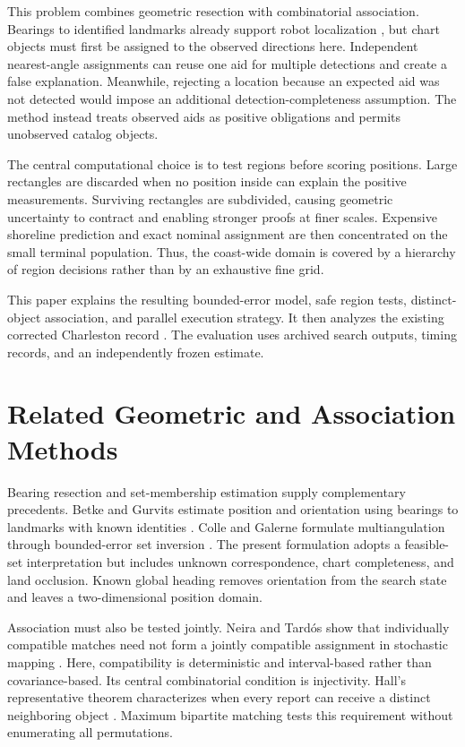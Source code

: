 \documentclass[conference]{IEEEtran}
\begin{document}
This problem combines geometric resection with combinatorial association. Bearings to identified landmarks already support robot localization \cite{Betke1997LandmarkLocalization}, but chart objects must first be assigned to the observed directions here. Independent nearest-angle assignments can reuse one aid for multiple detections and create a false explanation. Meanwhile, rejecting a location because an expected aid was not detected would impose an additional detection-completeness assumption. The method instead treats observed aids as positive obligations and permits unobserved catalog objects.

The central computational choice is to test regions before scoring positions. Large rectangles are discarded when no position inside can explain the positive measurements. Surviving rectangles are subdivided, causing geometric uncertainty to contract and enabling stronger proofs at finer scales. Expensive shoreline prediction and exact nominal assignment are then concentrated on the small terminal population. Thus, the coast-wide domain is covered by a hierarchy of region decisions rather than by an exhaustive fine grid.

This paper explains the resulting bounded-error model, safe region tests, distinct-object association, and parallel execution strategy. It then analyzes the existing corrected Charleston record \cite{Vaught2026CharlestonRecord}. The evaluation uses archived search outputs, timing records, and an independently frozen estimate.

\section{Related Geometric and Association Methods}
Bearing resection and set-membership estimation supply complementary precedents. Betke and Gurvits estimate position and orientation using bearings to landmarks with known identities \cite{Betke1997LandmarkLocalization}. Colle and Galerne formulate multiangulation through bounded-error set inversion \cite{Colle2013SetInversion}. The present formulation adopts a feasible-set interpretation but includes unknown correspondence, chart completeness, and land occlusion. Known global heading removes orientation from the search state and leaves a two-dimensional position domain.

Association must also be tested jointly. Neira and Tard\'os show that individually compatible matches need not form a jointly compatible assignment in stochastic mapping \cite{Neira2001JointCompatibility}. Here, compatibility is deterministic and interval-based rather than covariance-based. Its central combinatorial condition is injectivity. Hall's representative theorem characterizes when every report can receive a distinct neighboring object \cite{Hall1935Representatives}. Maximum bipartite matching tests this requirement without enumerating all permutations.
\end{document}
